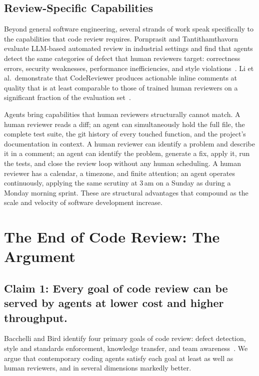 \documentclass[10pt,conference]{IEEEtran}
\begin{document}
\subsection{Review-Specific Capabilities}

Beyond general software engineering, several strands of work speak specifically to the capabilities that code review requires.
Pornprasit and Tantithamthavorn evaluate LLM-based automated review in industrial settings and find that agents detect the same categories of defect that human reviewers target: correctness errors, security weaknesses, performance inefficiencies, and style violations~\cite{pornprasit2023automated}.
Li et al.\ demonstrate that CodeReviewer produces actionable inline comments at quality that is at least comparable to those of trained human reviewers on a significant fraction of the evaluation set~\cite{li2022codereviewer}.

Agents bring capabilities that human reviewers structurally cannot match.
A human reviewer reads a diff; an agent can simultaneously hold the full file, the complete test suite, the git history of every touched function, and the project's documentation in context.
A human reviewer can identify a problem and describe it in a comment; an agent can identify the problem, generate a fix, apply it, run the tests, and close the review loop without any human scheduling.
A human reviewer has a calendar, a timezone, and finite attention; an agent operates continuously, applying the same scrutiny at 3\,am on a Sunday as during a Monday morning sprint.
These are structural advantages that compound as the scale and velocity of software development increase.


\section{The End of Code Review: The Argument}
\label{sec:argument}

\subsection{Claim 1: Every goal of code review can be served by agents at lower cost and higher throughput.}

Bacchelli and Bird identify four primary goals of code review: defect detection, style and standards enforcement, knowledge transfer, and team awareness~\cite{bacchelli2013expectations}.
We argue that contemporary coding agents satisfy each goal at least as well as human reviewers, and in several dimensions markedly better.
\end{document}
